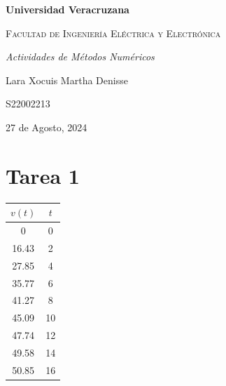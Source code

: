 \documentclass[letterpaper,12pt]{article}
\begin{document}
\thispagestyle{empty}
\newpage
\setcounter{page}{1}
\pagestyle{headings}
\begin{sloppypar} 
    \begin{titlepage}
        \hspace{2.5cm}
        {\bfseries\LARGE Universidad Veracruzana \par}
        \hspace{2cm}
        {\scshape\Large Facultad de Ingeniería Eléctrica y Electrónica \par}
        \begin{center}
            \vspace{7cm}
            {\itshape\huge Actividades de Métodos Numéricos \par}
            {\large Lara Xocuis Martha Denisse\par}
            {\large S22002213 \par}
            \vfill
            {\Large 27 de Agosto, 2024 \par}
        \end{center}
    \end{titlepage}
    
\section*{Tarea 1}
\begin{center}
    \begin{tabular}[H]{|c|c|}\hline 
        $v(t)$ & $t$ \\ \hline
        0 & 0 \\ \hline
        16.43 & 2 \\ \hline
        27.85 & 4 \\ \hline
        35.77 & 6 \\ \hline
        41.27 & 8 \\ \hline
        45.09 & 10 \\ \hline
        47.74 & 12  \\ \hline
        49.58 & 14 \\ \hline
        50.85 & 16 \\ \hline
    \end{tabular} 
\end{center}


\end{sloppypar}
\end{document}
